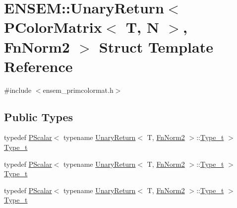\hypertarget{structENSEM_1_1UnaryReturn_3_01PColorMatrix_3_01T_00_01N_01_4_00_01FnNorm2_01_4}{}\section{E\+N\+S\+EM\+:\+:Unary\+Return$<$ P\+Color\+Matrix$<$ T, N $>$, Fn\+Norm2 $>$ Struct Template Reference}
\label{structENSEM_1_1UnaryReturn_3_01PColorMatrix_3_01T_00_01N_01_4_00_01FnNorm2_01_4}


{\ttfamily \#include $<$ensem\+\_\+primcolormat.\+h$>$}

\subsection*{Public Types}
\begin{DoxyCompactItemize}
\item 
typedef \mbox{\hyperlink{classENSEM_1_1PScalar}{P\+Scalar}}$<$ typename \mbox{\hyperlink{structENSEM_1_1UnaryReturn}{Unary\+Return}}$<$ T, \mbox{\hyperlink{structENSEM_1_1FnNorm2}{Fn\+Norm2}} $>$\+::\mbox{\hyperlink{structENSEM_1_1UnaryReturn_3_01PColorMatrix_3_01T_00_01N_01_4_00_01FnNorm2_01_4_ae6f0888acac23f20273fc635923e42cc}{Type\+\_\+t}} $>$ \mbox{\hyperlink{structENSEM_1_1UnaryReturn_3_01PColorMatrix_3_01T_00_01N_01_4_00_01FnNorm2_01_4_ae6f0888acac23f20273fc635923e42cc}{Type\+\_\+t}}
\item 
typedef \mbox{\hyperlink{classENSEM_1_1PScalar}{P\+Scalar}}$<$ typename \mbox{\hyperlink{structENSEM_1_1UnaryReturn}{Unary\+Return}}$<$ T, \mbox{\hyperlink{structENSEM_1_1FnNorm2}{Fn\+Norm2}} $>$\+::\mbox{\hyperlink{structENSEM_1_1UnaryReturn_3_01PColorMatrix_3_01T_00_01N_01_4_00_01FnNorm2_01_4_ae6f0888acac23f20273fc635923e42cc}{Type\+\_\+t}} $>$ \mbox{\hyperlink{structENSEM_1_1UnaryReturn_3_01PColorMatrix_3_01T_00_01N_01_4_00_01FnNorm2_01_4_ae6f0888acac23f20273fc635923e42cc}{Type\+\_\+t}}
\item 
typedef \mbox{\hyperlink{classENSEM_1_1PScalar}{P\+Scalar}}$<$ typename \mbox{\hyperlink{structENSEM_1_1UnaryReturn}{Unary\+Return}}$<$ T, \mbox{\hyperlink{structENSEM_1_1FnNorm2}{Fn\+Norm2}} $>$\+::\mbox{\hyperlink{structENSEM_1_1UnaryReturn_3_01PColorMatrix_3_01T_00_01N_01_4_00_01FnNorm2_01_4_ae6f0888acac23f20273fc635923e42cc}{Type\+\_\+t}} $>$ \mbox{\hyperlink{structENSEM_1_1UnaryReturn_3_01PColorMatrix_3_01T_00_01N_01_4_00_01FnNorm2_01_4_ae6f0888acac23f20273fc635923e42cc}{Type\+\_\+t}}
\end{DoxyCompactItemize}


